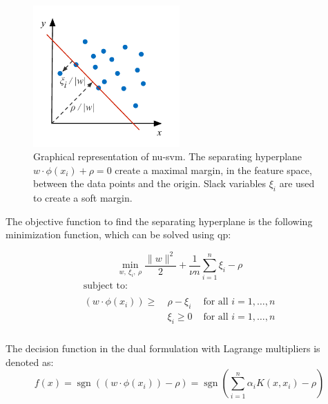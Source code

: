 \begin{figure}
  \centering
    \includegraphics[width=0.5\textwidth,keepaspectratio]{./Figures/chapter3/nu-svm.pdf}
  \caption[\gls{nu-svm}]{Graphical representation of \gls{nu-svm}. The separating hyperplane $w \cdot \phi(x_i) + \rho = 0$ create a maximal margin, in the feature space, between the data points and the origin. Slack variables $\xi_i$ are used to create a soft margin.}
  \label{fig:nu-svm}
\end{figure}

The objective function to find the separating hyperplane is the following minimization function, which can be solved using \gls{qp}:

\begin{equation}\label{eq:nu-svm_objective}
  \operatorname*{min}_{w,\ \xi_i,\ \rho } \frac{\lVert w \rVert ^2}{2} + \frac{1}{\nu n} \sum_{i=1}^n \xi_i - \rho
\end{equation}
\begin{equation}
  \begin{multlined}
    \mbox{ subject to: } \\
    \begin{aligned}
      (w \cdot \phi(x_i)) \geq \: & \rho - \xi_i & \mbox{ for all } i = 1, \dots, n \\
      & \xi_i \geq 0 & \mbox{ for all } i = 1, \dots, n \\
    \end{aligned}
  \end{multlined}
\end{equation}

The decision function in the dual formulation with Lagrange multipliers is denoted as:
\begin{equation}\label{eq:nu-svm_lagrange}
f(x) = \operatorname{sgn}((w \cdot \phi(x_i)) - \rho) = \operatorname{sgn}( \sum_{i=1}^n \alpha_i K(x, x_i) - \rho)
\end{equation}

